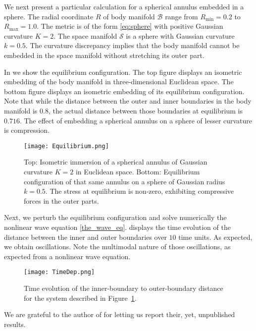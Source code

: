 \documentclass[smallextended]{svjour3}
\begin{document}
We next present a particular calculation for a spherical annulus embedded in a sphere.
The radial coordinate $R$ of body manifold ${\mathcal{B}}$ range from ${R_{\text{min}}}=0.2$ to ${R_{\text{max}}}=1.0$. The metric is of the form \eqref{eq:sphere} with positive Gaussian curvature $K=2$. The space manifold ${\mathcal{S}}$ is a sphere with Gaussian curvature $k=0.5$. The curvature discrepancy implies that the body manifold cannot be embedded in the space manifold without stretching its outer part.

In  we show the equilibrium configuration. The top figure displays an isometric embedding of the body manifold in three-dimensional Euclidean space. The bottom figure displays an isometric embedding of its equilibrium configuration. Note that while the distance between the outer and inner boundaries in the body manifold is $0.8$, the actual distance between those boundaries at equilibrium is $0.716$. The effect of embedding a spherical annulus on a sphere of lesser curvature is compression.

\begin{figure}[h]
\begin{center}
\texttt{[image: Equilibrium.png]}
\end{center}
\caption{Top: Isometric immersion of a spherical annulus of Gaussian curvature $K=2$ in Euclidean space. Bottom: Equilibrium configuration of that same annulus on a sphere of Gaussian radius $k=0.5$.  The stress at equilibrium is non-zero, exhibiting compressive forces in the outer parts.}
\label{fig:1}
\end{figure}

Next, we perturb the equilibrium configuration and solve numerically the nonlinear wave equation \eqref{the_wave_eq}.  displays the time evolution of the distance between the inner and outer boundaries over $10$ time units. As expected, we obtain oscillations. Note the multimodal nature of those oscillations, as expected from a nonlinear wave equation. 

\begin{figure}[h]
\begin{center}
\texttt{[image: TimeDep.png]}
\end{center}
\caption{Time evolution of the inner-boundary to outer-boundary distance for the system described in Figure~\ref{fig:1}.}
\label{fig:2}
\end{figure}

\begin{acknowledgements}
We are grateful to the author of \cite{AKMMS16} for letting us report their, yet, unpublished results.\end{acknowledgements}

      

\end{document}
